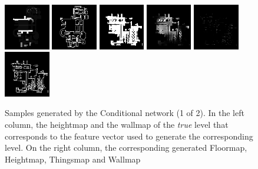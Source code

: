 \begin{figure}[h!]
\begin{minipage}[b]{\linewidth}
	\begin{center}
		\includegraphics[width=2cm]{figures/results/samples/cond/sample11_map_heightmap_true.png}
		\includegraphics[width=2cm]{figures/results/samples/cond/sample11_map_wallmap_true.png}
		\hfill 
		\includegraphics[width=2cm]{figures/results/samples/cond/sample11_map_floormap_generated.png}
		\includegraphics[width=2cm]{figures/results/samples/cond/sample11_map_heightmap_generated.png}
		\includegraphics[width=2cm]{figures/results/samples/cond/sample11_map_thingsmap_generated.png}
		\includegraphics[width=2cm]{figures/results/samples/cond/sample11_map_wallmap_generated.png}
	\end{center}
	

	\end{minipage}
\caption[Samples Generated by the Conditional network (1 of 2)]{Samples generated by the Conditional network (1 of 2). In the left column, the heightmap and the wallmap of the \textit{true} level that corresponds to the feature vector used to generate the corresponding level. On the right column, the corresponding generated Floormap, Heightmap, Thingsmap and Wallmap}
\label{fig:samples-cond-1}
\end{figure}

